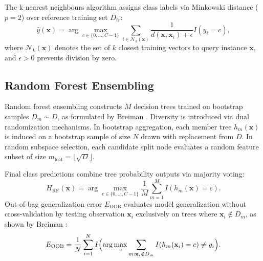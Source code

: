 \documentclass[10pt,conference,compsoc]{IEEEtran}
\begin{document}
The k-nearest neighbours algorithm assigns class labels via Minkowski distance ($p=2$) over reference training set $D_{tr}$:
\begin{equation}
\hat{y}(\mathbf{x}) = \arg\max_{c \in \{0,\dots,C-1\}} \sum_{i \in \mathcal{N}_k(\mathbf{x})} \frac{1}{d(\mathbf{x}, \mathbf{x}_i) + \epsilon} I(y_i = c),
\end{equation}
where $\mathcal{N}_k(\mathbf{x})$ denotes the set of $k$ closest training vectors to query instance $\mathbf{x}$, and $\epsilon > 0$ prevents division by zero.

\subsection{Random Forest Ensembling}
Random forest ensembling constructs $M$ decision trees trained on bootstrap samples $D_m \sim D$, as formulated by Breiman \cite{breiman2001}. Diversity is introduced via dual randomization mechanisms. In bootstrap aggregation, each member tree $h_m(\mathbf{x})$ is induced on a bootstrap sample of size $N$ drawn with replacement from $D$. In random subspace selection, each candidate split node evaluates a random feature subset of size $m_{\text{feat}} = \lfloor \sqrt{D} \rfloor$.

Final class predictions combine tree probability outputs via majority voting:
\begin{equation}
H_{\text{RF}}(\mathbf{x}) = \arg\max_{c \in \{0,\dots,C-1\}} \frac{1}{M} \sum_{m=1}^M I(h_m(\mathbf{x}) = c).
\end{equation}
Out-of-bag generalization error $E_{\text{OOB}}$ evaluates model generalization without cross-validation by testing observation $\mathbf{x}_i$ exclusively on trees where $\mathbf{x}_i \notin D_m$, as shown by Breiman \cite{breiman2001}:
\begin{equation}
E_{\text{OOB}} = \frac{1}{N} \sum_{i=1}^N I\Bigl( \arg\max_{c} \sum_{m: \mathbf{x}_i \notin D_m} I(h_m(\mathbf{x}_i) = c) \neq y_i \Bigr).
\end{equation}
\end{document}
